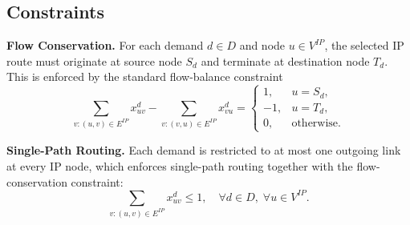 \documentclass[conference]{IEEEtran}
\begin{document}




\subsection{Constraints}

\textbf{Flow Conservation.} For each demand $d\in D$ and node $u\in V^{IP}$, the selected IP route must originate at source node $S_d$ and terminate at destination node $T_d$. This is enforced by the standard flow-balance constraint
\begin{equation}
    \sum_{v:(u,v)\in E^{IP}} x^{d}_{uv}
    -
    \sum_{v:(v,u)\in E^{IP}} x^{d}_{vu}
    =
    \begin{cases}
        1, & u = S_d,\\
       -1, & u = T_d,\\
        0, & \text{otherwise.}
    \end{cases}
    \label{eq:flow}
\end{equation}

\textbf{Single-Path Routing.} Each demand is restricted to at most one outgoing link at every IP node, which enforces single-path routing together with the flow-conservation constraint:
\begin{equation}
    \sum_{v:(u,v)\in E^{IP}} x^{d}_{uv} \leq 1,
    \quad \forall d\in D,\; \forall u\in V^{IP}.
    \label{eq:single-path}
\end{equation}
\end{document}

